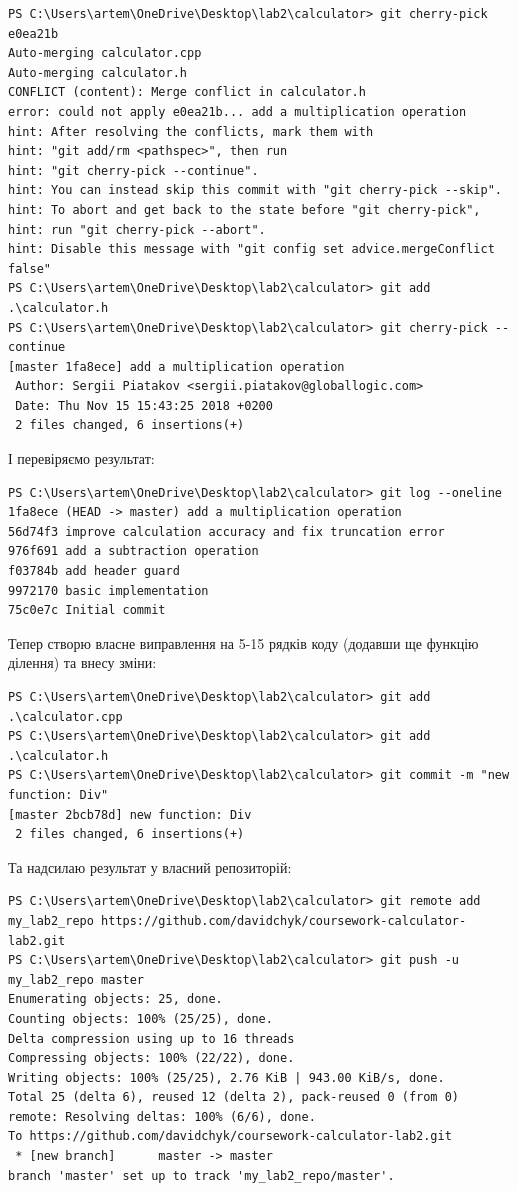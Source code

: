\documentclass[12pt,a4paper]{article}
\begin{document}
    \begin{verbatim}
PS C:\Users\artem\OneDrive\Desktop\lab2\calculator> git cherry-pick e0ea21b
Auto-merging calculator.cpp
Auto-merging calculator.h
CONFLICT (content): Merge conflict in calculator.h
error: could not apply e0ea21b... add a multiplication operation
hint: After resolving the conflicts, mark them with
hint: "git add/rm <pathspec>", then run
hint: "git cherry-pick --continue".
hint: You can instead skip this commit with "git cherry-pick --skip".
hint: To abort and get back to the state before "git cherry-pick",
hint: run "git cherry-pick --abort".
hint: Disable this message with "git config set advice.mergeConflict false"
PS C:\Users\artem\OneDrive\Desktop\lab2\calculator> git add .\calculator.h  
PS C:\Users\artem\OneDrive\Desktop\lab2\calculator> git cherry-pick --continue 
[master 1fa8ece] add a multiplication operation
 Author: Sergii Piatakov <sergii.piatakov@globallogic.com>
 Date: Thu Nov 15 15:43:25 2018 +0200
 2 files changed, 6 insertions(+)
    \end{verbatim}

    І перевіряємо результат:

    \begin{verbatim}
PS C:\Users\artem\OneDrive\Desktop\lab2\calculator> git log --oneline
1fa8ece (HEAD -> master) add a multiplication operation
56d74f3 improve calculation accuracy and fix truncation error
976f691 add a subtraction operation
f03784b add header guard
9972170 basic implementation
75c0e7c Initial commit
    \end{verbatim}

    Тепер створю власне виправлення на 5-15 рядків коду (додавши ще функцію ділення) та внесу зміни:
    \begin{verbatim}
PS C:\Users\artem\OneDrive\Desktop\lab2\calculator> git add .\calculator.cpp
PS C:\Users\artem\OneDrive\Desktop\lab2\calculator> git add .\calculator.h  
PS C:\Users\artem\OneDrive\Desktop\lab2\calculator> git commit -m "new function: Div" 
[master 2bcb78d] new function: Div
 2 files changed, 6 insertions(+)
    \end{verbatim}

    Та надсилаю результат у власний репозиторій:

    \begin{verbatim}
PS C:\Users\artem\OneDrive\Desktop\lab2\calculator> git remote add my_lab2_repo https://github.com/davidchyk/coursework-calculator-lab2.git
PS C:\Users\artem\OneDrive\Desktop\lab2\calculator> git push -u my_lab2_repo master
Enumerating objects: 25, done.
Counting objects: 100% (25/25), done.
Delta compression using up to 16 threads
Compressing objects: 100% (22/22), done.
Writing objects: 100% (25/25), 2.76 KiB | 943.00 KiB/s, done.
Total 25 (delta 6), reused 12 (delta 2), pack-reused 0 (from 0)
remote: Resolving deltas: 100% (6/6), done.
To https://github.com/davidchyk/coursework-calculator-lab2.git
 * [new branch]      master -> master
branch 'master' set up to track 'my_lab2_repo/master'.
    \end{verbatim}
\end{document}
